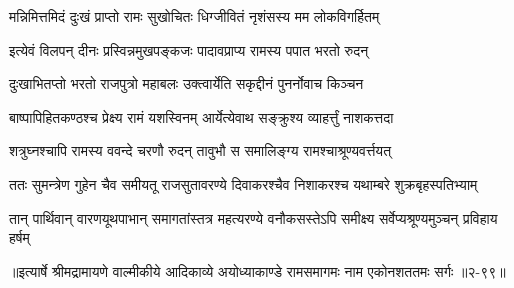\twolineshloka
{मन्निमित्तमिदं दुःखं प्राप्तो रामः सुखोचितः}
{धिग्जीवितं नृशंसस्य मम लोकविगर्हितम्} %

\twolineshloka
{इत्येवं विलपन् दीनः प्रस्विन्नमुखपङ्कजः}
{पादावप्राप्य रामस्य पपात भरतो रुदन्} %

\twolineshloka
{दुःखाभितप्तो भरतो राजपुत्रो महाबलः}
{उक्त्वार्येति सकृद्दीनं पुनर्नोवाच किञ्चन} %

\twolineshloka
{बाष्पापिहितकण्ठश्च प्रेक्ष्य रामं यशस्विनम्}
{आर्येत्येवाथ सङ्क्रुश्य व्याहर्त्तुं नाशकत्तदा} %

\twolineshloka
{शत्रुघ्नश्चापि रामस्य ववन्दे चरणौ रुदन्}
{तावुभौ स समालिङ्ग्य रामश्चाश्रूण्यवर्त्तयत्} %

\twolineshloka
{ततः सुमन्त्रेण गुहेन चैव समीयतू राजसुतावरण्ये}
{दिवाकरश्चैव निशाकरश्च यथाम्बरे शुक्रबृहस्पतिभ्याम्} %

\twolineshloka
{तान् पार्थिवान् वारणयूथपाभान् समागतांस्तत्र महत्यरण्ये}
{वनौकसस्तेऽपि समीक्ष्य सर्वेप्यश्रूण्यमुञ्चन् प्रविहाय हर्षम्} %


॥इत्यार्षे श्रीमद्रामायणे वाल्मीकीये आदिकाव्ये अयोध्याकाण्डे रामसमागमः नाम एकोनशततमः सर्गः ॥२-९९॥
